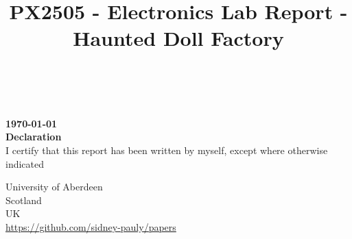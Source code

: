\documentclass[14pt]{article}
\begin{document}
\lstset{
  language=Python,
  basicstyle=\small,          %
  keywordstyle=\bfseries,
  identifierstyle=,           %
  commentstyle=,              %
  stringstyle=\ttfamily,      %
  showstringspaces=false,     %
  numbers=left,
  numberstyle=\tiny,
  numbersep=5pt,
  frame=tb,
}

\title{PX2505 - Electronics Lab Report - Haunted Doll Factory }
\date{}
\def\theinstructor{}




\fancyhf{}
\fancyhead[L]{\today}

\fancyfoot[C]{\thepage}

\begin{titlepage}
  \begin{center}
    \Large
    \textbf{\thetitle}
        
    \vspace{0.4cm}
    \large
    \thetitle
        
    \vspace{0.4cm}
    \textbf{\theauthor}\\
    \textbf{\theuoastudentid}\\
    \textbf{\today}\\

       
    \vspace{0.9cm}
    \textbf{Declaration}\\
    I certify that this report has been written by myself, except where otherwise
    indicated
  \end{center}

  \vfill

  \begin{center}

    University of Aberdeen\\
    Scotland\\
    UK\\
    \thedate
    \vspace{0.4cm}
    \url{https://github.com/sidney-pauly/papers}
  \end{center}
\end{titlepage}

\tableofcontents
\end{document}
